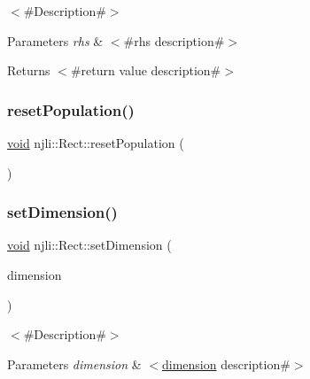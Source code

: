 $<$\#\+Description\#$>$


\begin{DoxyParams}{Parameters}
{\em rhs} & $<$\#rhs description\#$>$\\
\hline
\end{DoxyParams}
\begin{DoxyReturn}{Returns}
$<$\#return value description\#$>$ 
\end{DoxyReturn}
\mbox{\label{classnjli_1_1_rect_a56aa65f48127935bc155f447ff6fa6f1}} 
\subsubsection{\texorpdfstring{reset\+Population()}{resetPopulation()}}
{\footnotesize\ttfamily \mbox{\hyperlink{_thread_8h_af1e856da2e658414cb2456cb6f7ebc66}{void}} njli\+::\+Rect\+::reset\+Population (\begin{DoxyParamCaption}{ }\end{DoxyParamCaption})}

\mbox{\label{classnjli_1_1_rect_ae74eca301c718c9a3f7d8443dab062d1}} 
\subsubsection{\texorpdfstring{set\+Dimension()}{setDimension()}}
{\footnotesize\ttfamily \mbox{\hyperlink{_thread_8h_af1e856da2e658414cb2456cb6f7ebc66}{void}} njli\+::\+Rect\+::set\+Dimension (\begin{DoxyParamCaption}\item[{const bt\+Vector2 \&}]{dimension }\end{DoxyParamCaption})}

$<$\#\+Description\#$>$


\begin{DoxyParams}{Parameters}
{\em dimension} & $<$\mbox{\hyperlink{classnjli_1_1_rect_a1f9f935a849b021e525e470c9b4b27aa}{dimension}} description\#$>$ \\
\hline
\end{DoxyParams}
\mbox{\label{classnjli_1_1_rect_ad6867e2f09fe401a4648acbd8a572bc4}} 
